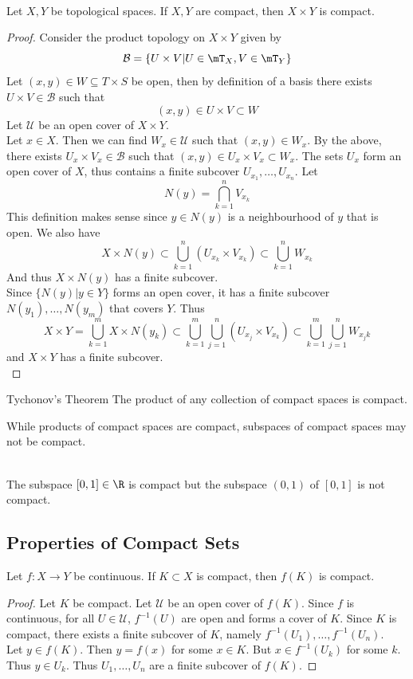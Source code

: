 \documentclass[a4paper]{article}
\begin{document}
\begin{prp}{}{}\\
Let $X,Y$ be topological spaces. If $X,Y$ are compact, then $X\times Y$ is compact. 
\begin{proof}
Consider the product topology on $X\times Y$ given by $$\mathcal{B}=\{U\times V|U\in\mT_X,V\in\mT_Y\}$$ Let $(x,y)\in W\subseteq T\times S$ be open, then by definition of a basis there exists $U\times V\in\mathcal{B}$ such that $$(x,y)\in U\times V\subset W$$ Let $\mathcal{U}$ be an open cover of $X\times Y$. \\
Let $x\in X$. Then we can find $W_x\in\mathcal{U}$ such that $(x,y)\in W_x$. By the above, there exists $U_x\times V_x\in\mathcal{B}$ such that $(x,y)\in U_x\times V_x\subset W_x$. The sets $U_x$ form an open cover of $X$, thus contains a finite subcover $U_{x_1},\dots,U_{x_n}$. Let $$N(y)=\bigcap_{k=1}^nV_{x_k}$$ This definition makes sense since $y\in N(y)$ is a neighbourhood of $y$ that is open. We also have $$X\times N(y)\subset\bigcup_{k=1}^n(U_{x_k}\times V_{x_k})\subset\bigcup_{k=1}^nW_{x_k}$$ And thus $X\times N(y)$ has a finite subcover. \\
Since $\{N(y)|y\in Y\}$ forms an open cover, it has a finite subcover $N(y_1),\dots,N(y_m)$ that covers $Y$. Thus $$X\times Y=\bigcup_{k=1}^mX\times N(y_k)\subset\bigcup_{k=1}^m\bigcup_{j=1}^n(U_{x_j}\times V_{x_k})\subset\bigcup_{k=1}^m\bigcup_{j=1}^nW_{x_jk}$$ and $X\times Y$ has a finite subcover. \\
\end{proof}
\end{prp}

\begin{thm}{Tychonov's Theorem}{} The product of any collection of compact spaces is compact. 
\end{thm}

While products of compact spaces are compact, subspaces of compact spaces may not be compact. 

\begin{eg}{}{}\\
The subspace $[0,1]\in\R$ is compact but the subspace $(0,1)$ of $[0,1]$ is not compact. 
\end{eg}

\subsection{Properties of Compact Sets}
\begin{prp}{}{} Let $f:X\to Y$ be continuous. If $K\subset X$ is compact, then $f(K)$ is compact.  
\begin{proof}
Let $K$ be compact. Let $\mathcal{U}$ be an open cover of $f(K)$. Since $f$ is continuous, for all $U\in\mathcal{U}$, $f^{-1}(U)$ are open and forms a cover of $K$. Since $K$ is compact, there exists a finite subcover of $K$, namely $f^{-1}(U_1),\dots,f^{-1}(U_n)$. \\
Let $y\in f(K)$. Then $y=f(x)$ for some $x\in K$. But $x\in f^{-1}(U_k)$ for some $k$. Thus $y\in U_k$. Thus $U_1,\dots,U_n$ are a finite subcover of $f(K)$. 
\end{proof}
\end{prp}
\end{document}
